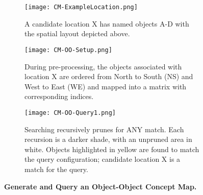 

\begin{figure*}[h]
    \centering
    \begin{subfigure}[t]{.25\textwidth}
        \texttt{[image: CM-ExampleLocation.png]}
        \caption{\small A candidate location X has named objects A-D with the spatial layout depicted above.}
        \label{fig:CM-Example}
    \end{subfigure}
    \hfill
    \begin{subfigure}[t]{.25\textwidth}
        \texttt{[image: CM-OO-Setup.png]}
        \caption{\small During pre-processing, the objects associated with location X are ordered from North to South (NS) and West to East (WE) and mapped into a matrix with corresponding indices.}
        \label{fig:CM-OO-Setup}
    \end{subfigure}
    \hfill
        \begin{subfigure}[t]{.25\textwidth}
        \texttt{[image: CM-OO-Query1.png]}
        \caption{\small Searching recursively prunes for ANY match. Each recursion is a darker shade, with an unpruned area in white. Objects highlighted in yellow are found to match the query configuration; candidate location X is a match for the query.}
        \label{fig:CM-OO-Query}
    \hfill
    \end{subfigure}
    \caption{\textbf{Generate and Query an Object-Object Concept Map.}}\label{figure:ConceptMap} 
\end{figure*}

